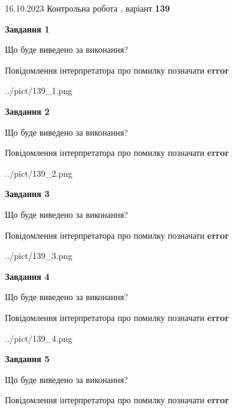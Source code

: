 \documentclass[12pt, ukrainian]{article}
\begin{document}
{\Large{16.10.2023 Контрольна робота , варіант  \No \textbf { 139 }\par}}
{
\begin {large}
{\begin {center}\textbf{Завдання 1}\end {center}}\par
Що буде виведено за виконання? \par
Повідомлення інтерпретатора про помилку позначати \textbf{error}

\begin{center}
	{../pict/139_1.png}
\end{center}
\newpage

{\begin {center}\textbf{Завдання 2}\end {center}}\par
Що буде виведено за виконання? \par
Повідомлення інтерпретатора про помилку позначати \textbf{error}

\begin{center}
	{../pict/139_2.png}
\end{center}
\newpage

{\begin {center}\textbf{Завдання 3}\end {center}}\par
Що буде виведено за виконання? \par
Повідомлення інтерпретатора про помилку позначати \textbf{error}

\begin{center}
	{../pict/139_3.png}
\end{center}
\newpage

{\begin {center}\textbf{Завдання 4}\end {center}}\par
Що буде виведено за виконання? \par
Повідомлення інтерпретатора про помилку позначати \textbf{error}

\begin{center}
	{../pict/139_4.png}
\end{center}
\newpage

{\begin {center}\textbf{Завдання 5}\end {center}}\par
Що буде виведено за виконання? \par
Повідомлення інтерпретатора про помилку позначати \textbf{error}


\end{large}}
\end{document}
